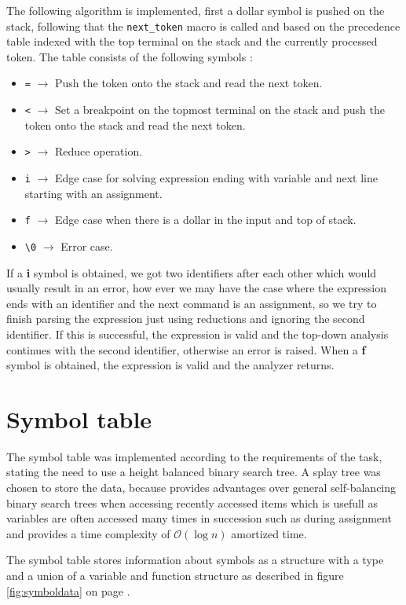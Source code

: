 \documentclass[11pt]{article}
\begin{document}
The following algorithm is implemented, first a dollar symbol is pushed on the stack, following that the \texttt{next\_token} macro is called and based on the precedence table indexed with the top terminal on the stack and the currently processed token. The table consists of the following symbols :
\begin{itemize}
\item \texttt{=} $\rightarrow$ Push the token onto the stack and read the next token.
\item \texttt{<} $\rightarrow$  Set a breakpoint on the topmost terminal on the stack and push the token onto the stack and read the next token.
\item \texttt{>} $\rightarrow$  Reduce operation.
\item \texttt{i} $\rightarrow$  Edge case for solving expression ending with variable and next line starting with an assignment.
\item \texttt{f} $\rightarrow$  Edge case when there is a dollar in the input and top of stack.
\item \texttt{\textbackslash 0} $\rightarrow$  Error case.
\end{itemize}

If a \textbf{i} symbol is obtained, we got two identifiers after each other which would usually result in an error, how ever we may have the case where the expression ends with an identifier and the next command is an assignment, so we try to finish parsing the expression just using reductions and ignoring the second identifier. If this is successful, the expression is valid and the top-down analysis continues with the second identifier, otherwise an error is raised.
When a \textbf{f} symbol is obtained, the expression is valid and the analyzer returns.
\section{Symbol table}

The symbol table was implemented according to the requirements of the task, stating the need to use a height balanced binary search tree. A splay tree was chosen to store the data, because provides advantages over general self-balancing binary search trees when accessing recently accessed items which is usefull as variables are often accessed many times in succession such as during assignment and provides a time complexity of $\mathcal{O}(\log{}n)$ amortized time.

The symbol table stores information about symbols as a structure with a type and a union of a variable and function structure as described in figure \ref{fig:symboldata} on page \pageref{fig:symboldata}.
\end{document}
